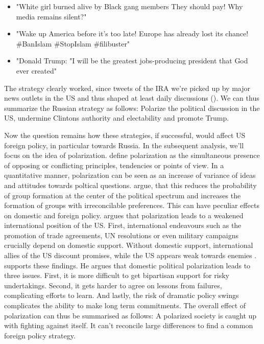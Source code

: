 \documentclass[12pt, authoryear]{elsarticle}
\begin{document}
\begin{itemize}

\item "White girl burned alive by Black gang members  They should pay! Why media remains silent?"

\item "Wake up America before it's too late! Europe has already lost its chance!  \#BanIslam \#StopIslam \#filibuster"

\item "Donald Trump: "I will be the greatest jobs-producing president that God ever created"

\end{itemize}

The strategy clearly worked, since tweets of the IRA we're picked up by major news outlets in the US and thus shaped at least daily discussions (\cite{mueller2019report}). We can thus summarize the Russian strategy as follows: Polarize the political discussion in the US, undermine Clintons authority and electability and promote Trump. 

Now the question remains how these strategies, if successful, would affect US foreign policy, in particular towards Russia. In the subsequent analysis, we'll focus on the idea of polarization. \cite{fiorina2008political} define polarization as the simultaneous presence of opposing or conflicting principles, tendencies or points of view. In a quantitative manner, polarization can be seen as an increase of variance of ideas and attitudes towards poltical questions. \cite{dimaggio1996have} argue, that this reduces the probability of group formation at the center of the political spectrum and increases the formation of groups with irreconcilable preferences. This can have peculiar effects on domestic and foreign policy. \cite{beinart2008politics} argues that polarization leads to a weakened international position of the US. First, international endeavours such as the promotion of trade agreements, UN resolutions or even military campaigns crucially depend on domestic support. Without domestic support, international allies of the US discount promises, while the US appears weak towards enemies \citep{beinart2008politics}. \cite{schultz2017perils} supports these findings. He argues that domestic political polarization leads to three issues. First, it is more difficult to get bipartisan support for risky undertakings. Second, it gets harder to agree on lessons from failures, complicating efforts to learn. And lastly, the risk of dramatic policy swings complicates the ability to make long term commitments. The overall effect of polarization can thus be summarised as follows: A polarized society is caught up with fighting against itself. It can't 
reconcile large differences to find a common foreign policy strategy. 
\end{document}
